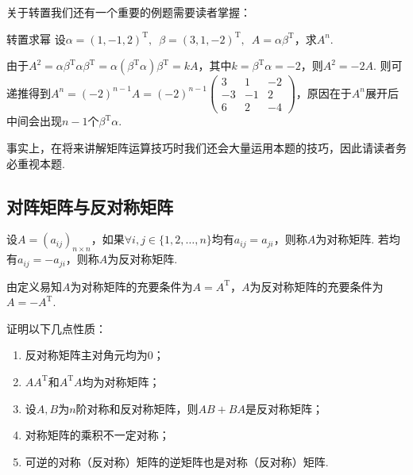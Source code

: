 关于转置我们还有一个重要的例题需要读者掌握：
\begin{example}{}{转置求幂}
    设$\alpha=(1,-1,2)^\mathrm{T},\enspace\beta=(3,1,-2)^\mathrm{T},\enspace A=\alpha\beta^\mathrm{T}$，求$A^n$.
\end{example}

\begin{solution}
    由于$A^2=\alpha\beta^\mathrm{T}\alpha\beta^\mathrm{T}=\alpha(\beta^\mathrm{T}\alpha)\beta^\mathrm{T}=kA$，其中$k=\beta^\mathrm{T}\alpha=-2$，则$A^2=-2A$. 则可递推得到$A^n=(-2)^{n-1}A=(-2)^{n-1}\begin{pmatrix}
            3 & 1 & -2 \\ -3 & -1 & 2 \\ 6 & 2 & -4
        \end{pmatrix}$，原因在于$A^n$展开后中间会出现$n-1$个$\beta^\mathrm{T}\alpha$.
\end{solution}

事实上，在将来讲解矩阵运算技巧时我们还会大量运用本题的技巧，因此请读者务必重视本题.

\subsection{对阵矩阵与反对称矩阵}

\begin{definition}{}{}
    设$A=(a_{ij})_{n \times n}$，如果$\forall i,j\in\{1,2,\ldots,n\}$均有$a_{ij}=a_{ji}$，则称$A$为对称矩阵. 若均有$a_{ij}=-a_{ji}$，则称$A$为反对称矩阵.
\end{definition}
由定义易知$A$为对称矩阵的充要条件为$A=A^\mathrm{T}$，$A$为反对称矩阵的充要条件为$A=-A^\mathrm{T}$.
\begin{example}{}{}
    证明以下几点性质：
    \begin{enumerate}
        \item 反对称矩阵主对角元均为0；

        \item $AA^\mathrm{T}$和$A^\mathrm{T}A$均为对称矩阵；

        \item 设$A,B$为$n$阶对称和反对称矩阵，则$AB+BA$是反对称矩阵；

        \item 对称矩阵的乘积不一定对称；

        \item 可逆的对称（反对称）矩阵的逆矩阵也是对称（反对称）矩阵.
    \end{enumerate}
\end{example}

